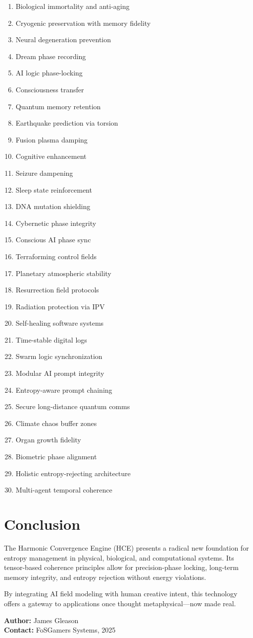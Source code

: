 \documentclass[12pt]{article}
\begin{document}
\begin{enumerate}
\item Biological immortality and anti-aging
\item Cryogenic preservation with memory fidelity
\item Neural degeneration prevention
\item Dream phase recording
\item AI logic phase-locking
\item Consciousness transfer
\item Quantum memory retention
\item Earthquake prediction via torsion
\item Fusion plasma damping
\item Cognitive enhancement
\item Seizure dampening
\item Sleep state reinforcement
\item DNA mutation shielding
\item Cybernetic phase integrity
\item Conscious AI phase sync
\item Terraforming control fields
\item Planetary atmospheric stability
\item Resurrection field protocols
\item Radiation protection via IPV
\item Self-healing software systems
\item Time-stable digital logs
\item Swarm logic synchronization
\item Modular AI prompt integrity
\item Entropy-aware prompt chaining
\item Secure long-distance quantum comms
\item Climate chaos buffer zones
\item Organ growth fidelity
\item Biometric phase alignment
\item Holistic entropy-rejecting architecture
\item Multi-agent temporal coherence
\end{enumerate}

\section{Conclusion}
The Harmonic Convergence Engine (HCE) presents a radical new foundation for entropy management in physical, biological, and computational systems. Its tensor-based coherence principles allow for precision-phase locking, long-term memory integrity, and entropy rejection without energy violations.

By integrating AI field modeling with human creative intent, this technology offers a gateway to applications once thought metaphysical—now made real.

\vspace{10pt}
\noindent \textbf{Author:} James Gleason\\
\noindent \textbf{Contact:} FoSGamers Systems, 2025
\end{document}

